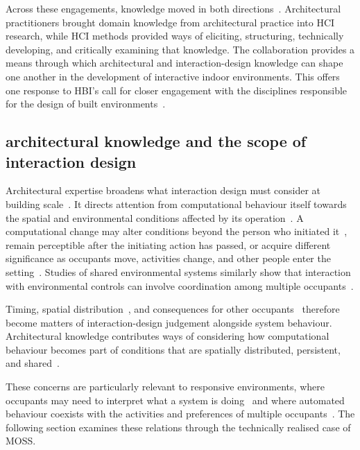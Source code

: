Across these engagements, knowledge moved in both directions~\cite{rao2025designing,rao2026biophilic,rao2027biophilic}. Architectural practitioners brought domain knowledge from architectural practice into HCI research, while HCI methods provided ways of eliciting, structuring, technically developing, and critically examining that knowledge.  The collaboration provides a means through which architectural and interaction-design knowledge can shape one another in the development of interactive indoor environments. This offers one response to HBI's call for closer engagement with the disciplines responsible for the design of built environments~\cite{alavi2018artifacts,alavi2019introduction,kirsh2019architects}.


\subsection{architectural knowledge and the scope of interaction design}
\label{subsec:architectural-inhabitable-relation}

Architectural expertise broadens what interaction design must consider at building scale~\cite{kirsh2019architects}. It directs attention from computational behaviour itself towards the spatial and environmental conditions affected by its operation~\cite{nguyen2022responsive}. A computational change may alter conditions beyond the person who initiated it~\cite{niemantsverdriet2018share}, remain perceptible after the initiating action has passed, or acquire different significance as occupants move, activities change, and other people enter the setting~\cite{alavi2018artifacts,nguyen2022responsive,nguyen2024adaptive}. Studies of shared environmental systems similarly show that interaction with environmental controls can involve coordination among multiple occupants~\cite{niemantsverdriet2018share,vanDeWerff2019lighting}.

Timing, spatial distribution~\cite{nguyen2022responsive,nguyen2024adaptive}, and consequences for other occupants~\cite{niemantsverdriet2018share,vanDeWerff2019lighting} therefore become matters of interaction-design judgement alongside system behaviour. Architectural knowledge contributes ways of considering how computational behaviour becomes part of conditions that are spatially distributed, persistent, and shared~\cite{alavi2018artifacts,alavi2019introduction,wiberg2020interaction}.

These concerns are particularly relevant to responsive environments, where occupants may need to interpret what a system is doing~\cite{bellotti2002making,lim2009and} and where automated behaviour coexists with the activities and preferences of multiple occupants~\cite{vanDeWerff2019lighting,niemantsverdriet2018share}. The following section examines these relations through the technically realised case of MOSS.



